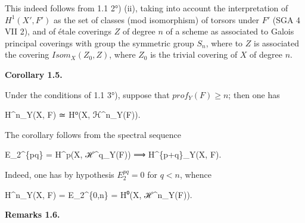 \documentclass[
]{article}
\newenvironment{Shaded}{}{}
\newcommand{\NormalTok}[1]{#1}
\begin{document}
This indeed follows from 1.1 2°) (ii), taking into account the
interpretation of \(H^{1}(X', F')\) as the set of classes (mod
isomorphism) of torsors under \(F'\) (SGA 4 VII 2), and of étale
coverings \(Z\) of degree \(n\) of a scheme as associated to Galois
principal coverings with group the symmetric group \(S_{n}\), where to
\(Z\) is associated the covering \(Isom_{X}(Z_{0}, Z)\), where \(Z_{0}\)
is the trivial covering of \(X\) of degree \(n\).

\textbf{Corollary 1.5.}

Under the conditions of 1.1 3°), suppose that
\(prof_{Y}(F) \geqslant n\); then one has

\begin{Shaded}
\begin{Highlighting}[]
\NormalTok{H\^{}n\_Y(X, F) ≃ H⁰(X, ℋ\^{}n\_Y(F)).}
\end{Highlighting}
\end{Shaded}

The corollary follows from the spectral sequence

\begin{Shaded}
\begin{Highlighting}[]
\NormalTok{E\_2\^{}\{pq\} = H\^{}p(X, ℋ\^{}q\_Y(F)) ⟹ H\^{}\{p+q\}\_Y(X, F).}
\end{Highlighting}
\end{Shaded}

Indeed, one has by hypothesis \(E^{pq}_{2} = 0\) for \(q < n\), whence

\begin{Shaded}
\begin{Highlighting}[]
\NormalTok{H\^{}n\_Y(X, F) = E\_2\^{}\{0,n\} = H⁰(X, ℋ\^{}n\_Y(F)).}
\end{Highlighting}
\end{Shaded}

\textbf{Remarks 1.6.}
\end{document}
